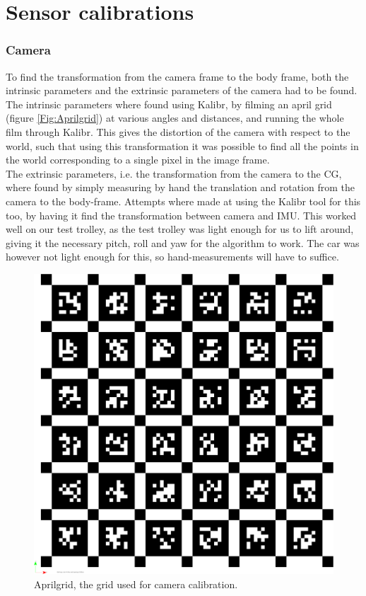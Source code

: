\section{Sensor calibrations}

\subsubsection{Camera}
To find the transformation from the camera frame to the body frame, both the intrinsic parameters and the extrinsic parameters of the camera had to be found. The intrinsic parameters where found using Kalibr\cite{Kalibr1}\cite{Kalibr2}\cite{Kalibr3}, by filming an april grid (figure \ref{Fig:Aprilgrid}) at various angles and distances, and running the whole film through Kalibr. This gives the distortion of the camera with respect to the world, such that using this transformation it was possible to find all the points in the world corresponding to a single pixel in the image frame. \\

The extrinsic parameters, i.e. the transformation from the camera to the CG, where found by simply measuring by hand the translation and rotation from the camera to the body-frame. Attempts where made at using the Kalibr tool for this too, by having it find the transformation between camera and IMU. This worked well on our test trolley, as the test trolley was light enough for us to lift around, giving it the necessary pitch, roll and yaw for the algorithm to work. The car was however not light enough for this, so hand-measurements will have to suffice.

\begin{figure}
    \centering
    \includegraphics[width=0.5\linewidth]{0_Images/4_Implementation/aprilgrid.pdf}
    \caption[Aprilgrid, the grid used for camera calibration.]
    {Aprilgrid, the grid used for camera calibration.}
    \label{Fig:psiErrorCamera}
\end{figure}

